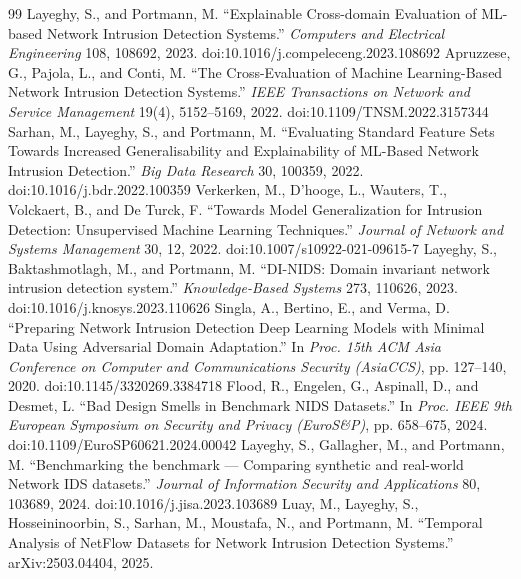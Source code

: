 \documentclass[preprint,12pt]{elsarticle}
\begin{document}
\begin{thebibliography}{99}
 Layeghy, S., and Portmann, M. ``Explainable Cross-domain Evaluation of ML-based Network Intrusion Detection Systems.'' \emph{Computers and Electrical Engineering} 108, 108692, 2023. doi:10.1016/j.compeleceng.2023.108692
 Apruzzese, G., Pajola, L., and Conti, M. ``The Cross-Evaluation of Machine Learning-Based Network Intrusion Detection Systems.'' \emph{IEEE Transactions on Network and Service Management} 19(4), 5152--5169, 2022. doi:10.1109/TNSM.2022.3157344
 Sarhan, M., Layeghy, S., and Portmann, M. ``Evaluating Standard Feature Sets Towards Increased Generalisability and Explainability of ML-Based Network Intrusion Detection.'' \emph{Big Data Research} 30, 100359, 2022. doi:10.1016/j.bdr.2022.100359
 Verkerken, M., D'hooge, L., Wauters, T., Volckaert, B., and De Turck, F. ``Towards Model Generalization for Intrusion Detection: Unsupervised Machine Learning Techniques.'' \emph{Journal of Network and Systems Management} 30, 12, 2022. doi:10.1007/s10922-021-09615-7
 Layeghy, S., Baktashmotlagh, M., and Portmann, M. ``DI-NIDS: Domain invariant network intrusion detection system.'' \emph{Knowledge-Based Systems} 273, 110626, 2023. doi:10.1016/j.knosys.2023.110626
 Singla, A., Bertino, E., and Verma, D. ``Preparing Network Intrusion Detection Deep Learning Models with Minimal Data Using Adversarial Domain Adaptation.'' In \emph{Proc. 15th ACM Asia Conference on Computer and Communications Security (AsiaCCS)}, pp. 127--140, 2020. doi:10.1145/3320269.3384718
 Flood, R., Engelen, G., Aspinall, D., and Desmet, L. ``Bad Design Smells in Benchmark NIDS Datasets.'' In \emph{Proc. IEEE 9th European Symposium on Security and Privacy (EuroS\&P)}, pp. 658--675, 2024. doi:10.1109/EuroSP60621.2024.00042
 Layeghy, S., Gallagher, M., and Portmann, M. ``Benchmarking the benchmark --- Comparing synthetic and real-world Network IDS datasets.'' \emph{Journal of Information Security and Applications} 80, 103689, 2024. doi:10.1016/j.jisa.2023.103689
 Luay, M., Layeghy, S., Hosseininoorbin, S., Sarhan, M., Moustafa, N., and Portmann, M. ``Temporal Analysis of NetFlow Datasets for Network Intrusion Detection Systems.'' arXiv:2503.04404, 2025.
\end{thebibliography}
\end{document}

